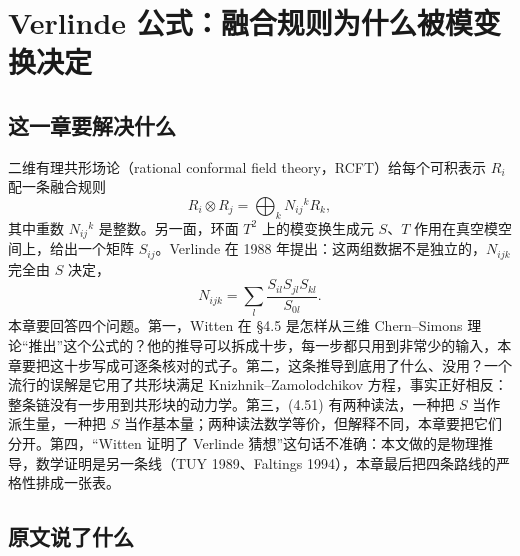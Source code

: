 \section{Verlinde 公式：融合规则为什么被模变换决定}
\label{sec:verlinde}

\subsection{这一章要解决什么}

二维有理共形场论（rational conformal field theory，RCFT）给每个可积表示 $R_i$ 配一条融合规则
\begin{equation}
R_i\otimes R_j=\bigoplus_k N_{ij}{}^{k}R_k ,
\label{eq:fusion-v}
\end{equation}
其中重数 $N_{ij}{}^{k}$ 是整数。另一面，环面 $T^2$ 上的模变换生成元 $S$、$T$ 作用在真空模空间上，给出一个矩阵 $S_{ij}$。Verlinde 在 1988 年提出：这两组数据不是独立的，$N_{ijk}$ 完全由 $S$ 决定，
\begin{equation}
N_{ijk}=\sum_l\frac{S_{il}S_{jl}S_{kl}}{S_{0l}} .
\label{eq:verlinde}
\end{equation}
本章要回答四个问题。第一，Witten 在 \S4.5 是怎样从三维 Chern--Simons 理论“推出”这个公式的？他的推导可以拆成十步，每一步都只用到非常少的输入，本章要把这十步写成可逐条核对的式子。第二，这条推导到底用了什么、没用？一个流行的误解是它用了共形块满足 Knizhnik--Zamolodchikov 方程，事实正好相反：整条链没有一步用到共形块的动力学。第三，(4.51) 有两种读法，一种把 $S$ 当作派生量，一种把 $S$ 当作基本量；两种读法数学等价，但解释不同，本章要把它们分开。第四，“Witten 证明了 Verlinde 猜想”这句话不准确：本文做的是物理推导，数学证明是另一条线（TUY 1989、Faltings 1994），本章最后把四条路线的严格性排成一张表。

\subsection{原文说了什么}

